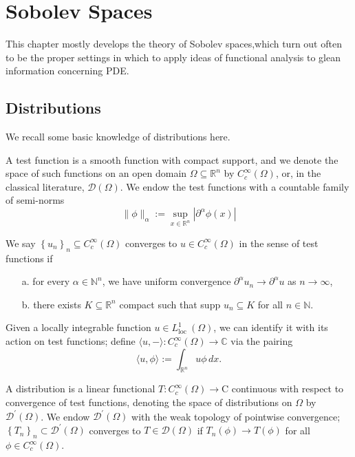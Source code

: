\newpage 
\chapter{Sobolev Spaces}

This chapter mostly develops the theory of Sobolev spaces,which turn 
out often to be the proper settings in which to apply ideas of functional 
analysis to glean information concerning PDE.

\section{Distributions}

We recall some basic knowledge of distributions here.
\begin{definition}
A test function is a smooth function with compact support, and we denote the space of such functions on an open domain $\Omega \subseteq \mathbb{R}^{n}$ by $C_{c}^{\infty}(\Omega)$, or, in the classical literature, $\mathcal{D}(\Omega)$. We endow the test functions with a countable family of semi-norms
$$
\|\phi\|_{\alpha}:=\sup _{x \in \mathbb{R}^{n}}\left|\partial^{\alpha} \phi(x)\right|
$$

\end{definition}
We say $\left\{u_{n}\right\}_{n} \subseteq C_{c}^{\infty}(\Omega)$ converges to $u \in C_{c}^{\infty}(\Omega)$ in the sense of test functions if
\begin{itemize}
    \item [a.] for every $\alpha \in \mathbb{N}^{n}$, we have uniform convergence $\partial^{\alpha} u_{n} \rightarrow \partial^{\alpha} u$ as $n \rightarrow \infty$,
    \item [b.] there exists $K \subseteq \mathbb{R}^{n}$ compact such that supp $u_{n} \subseteq K$ for all $n \in \mathbb{N}$.
\end{itemize}

Given a locally integrable function $u \in L_{\text {loc }}^{1}(\Omega)$, we can identify it with its action on test functions; define $\langle u,-\rangle: C_{c}^{\infty}(\Omega) \rightarrow \mathbb{C}$ via the pairing
$$
\langle u, \phi\rangle:=\int_{\mathbb{R}^{n}} u \phi\, d x .
$$

\begin{definition}
[Distribution]
A distribution is a linear functional $T: C_{c}^{\infty}(\Omega) \rightarrow \mathrm{C}$ continuous with respect to convergence of test functions, denoting the space of distributions on $\Omega$ by $\mathcal{D}^{\prime}(\Omega)$. We endow $\mathcal{D}^{\prime}(\Omega)$ with the weak topology of pointwise convergence; $\left\{T_{n}\right\}_{n} \subset \mathcal{D}^{\prime}(\Omega)$ converges to $T \in \mathcal{D}(\Omega)$ if $T_{n}(\phi) \rightarrow T(\phi)$ for all $\phi \in C_{c}^{\infty}(\Omega)$.
\end{definition}


